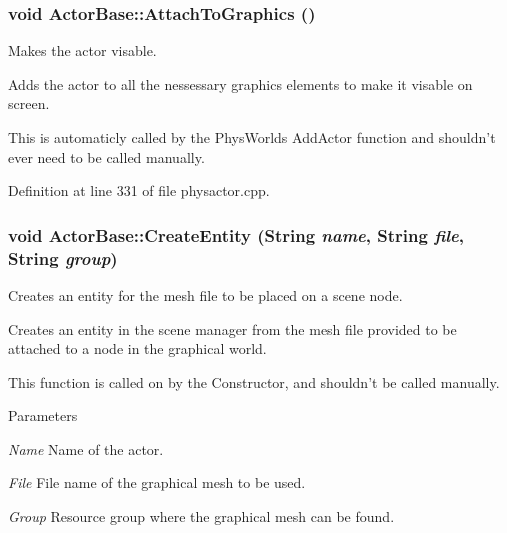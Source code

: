 \hypertarget{classActorBase_afab604970fede16ccde0c6b8e72d9ee0}{
\subsubsection[{AttachToGraphics}]{\setlength{\rightskip}{0pt plus 5cm}void ActorBase::AttachToGraphics ()}}
\label{dd/d7b/classActorBase_afab604970fede16ccde0c6b8e72d9ee0}


Makes the actor visable. 

Adds the actor to all the nessessary graphics elements to make it visable on screen. \par
 This is automaticly called by the PhysWorlds AddActor function and shouldn't ever need to be called manually. 

Definition at line 331 of file physactor.cpp.

\hypertarget{classActorBase_a7fd55114a59fe098a217314cf29cd055}{
\subsubsection[{CreateEntity}]{\setlength{\rightskip}{0pt plus 5cm}void ActorBase::CreateEntity (String {\em name}, \/  String {\em file}, \/  String {\em group})}}
\label{dd/d7b/classActorBase_a7fd55114a59fe098a217314cf29cd055}


Creates an entity for the mesh file to be placed on a scene node. 

Creates an entity in the scene manager from the mesh file provided to be attached to a node in the graphical world. \par
 This function is called on by the Constructor, and shouldn't be called manually. 
\begin{DoxyParams}{Parameters}
\item[{\em Name}]Name of the actor. \item[{\em File}]File name of the graphical mesh to be used. \item[{\em Group}]Resource group where the graphical mesh can be found. \end{DoxyParams}


